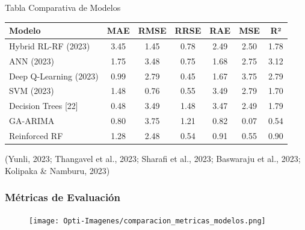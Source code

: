 \documentclass[aspectratio=1610]{beamer}
\begin{document}
\begin{frame}{Tabla Comparativa de Modelos}
  \begin{table}[ht]
    \centering
    \scriptsize
    \begin{tabular}{@{}lcccccc@{}}
      \toprule
      \textbf{Modelo} & \textbf{MAE} & \textbf{RMSE} & \textbf{RRSE} & \textbf{RAE} & \textbf{MSE} & \textbf{R²} \\
      \midrule
      Hybrid RL-RF {\footnotesize (2023)} & 3.45 & 1.45 & 0.78 & 2.49 & 2.50 & 1.78 \\
      ANN {\footnotesize (2023)}            & 1.75 & 3.48 & 0.75 & 1.68 & 2.75 & 3.12 \\
      Deep Q-Learning {\footnotesize (2023)}& 0.99 & 2.79 & 0.45 & 1.67 & 3.75 & 2.79 \\
      SVM {\footnotesize (2023)}            & 1.48 & 0.76 & 0.55 & 3.49 & 2.79 & 1.70 \\
      Decision Trees {\footnotesize [22]}   & 0.48 & 3.49 & 1.48 & 3.47 & 2.49 & 1.79 \\
      \midrule
      GA-ARIMA                 & 0.80 & 3.75 & 1.21 & 0.82 & 0.07 & 0.54 \\
      Reinforced RF             & 1.28 & 2.48 & 0.54 & 0.91 & 0.55 & 0.90 \\
      \bottomrule
    \end{tabular}
  \end{table}
  {\footnotesize (Yunli, 2023; Thangavel et al., 2023; Sharafi et al., 2023; Baswaraju et al., 2023; Kolipaka \& Namburu, 2023)}
\end{frame}

\begin{frame}[fragile]
    \frametitle{Métricas de Evaluación}
    \begin{figure}
        \centering
        \texttt{[image: Opti-Imagenes/comparacion\_metricas\_modelos.png]}
    \end{figure}
\end{frame}
\end{document}
